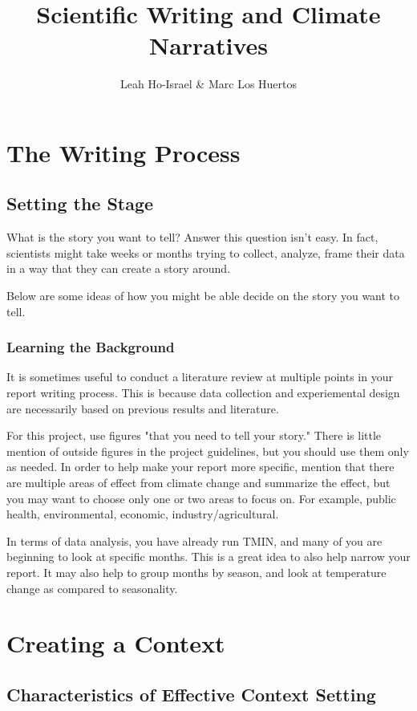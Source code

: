 \documentclass{article}\usepackage[]{graphicx}\usepackage[]{color}
\title{Scientific Writing and Climate Narratives}
\author{Leah Ho-Israel \& Marc Los Huertos}
\begin{document}
\maketitle

\section{The Writing Process}

\subsection{Setting the Stage}

What is the story you want to tell? Answer this question isn't easy. In fact, scientists might take weeks or months trying to collect, analyze, frame their data in a way that they can create a story around. 

Below are some ideas of how you might be able decide on the story you want to tell. 

\subsubsection{Learning the Background}

It is sometimes useful to conduct a literature review at multiple points in your report writing process. This is because data collection and experiemental design are necessarily based on previous results and literature.

For this project, use figures "that you need to tell your story." There is little mention of outside figures in the project guidelines, but you should use them only as needed. 
In order to help make your report more specific, mention that there are multiple areas of effect from climate change and summarize the effect, but you may want to choose only one or two areas to focus on. For example, public health, environmental, economic, industry/agricultural. 

In terms of data analysis, you have already run TMIN, and many of you are beginning to look at specific months. This is a great idea to also help narrow your report. It may also help to group months by season, and look at temperature change as compared to seasonality.

\section{Creating a Context}

\subsection{Characteristics of Effective Context Setting}
\end{document}
